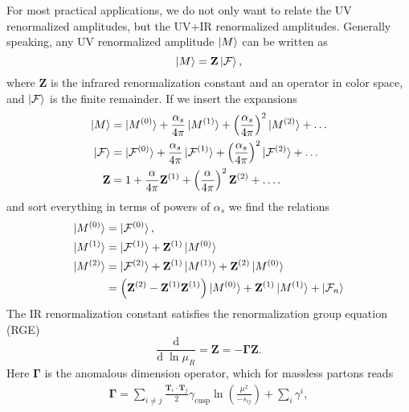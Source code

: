 \documentclass[a4paper,11pt]{article}
\begin{document}
For most practical applications, we do not only want to relate the UV renormalized amplitudes, but the UV+IR renormalized amplitudes. Generally speaking, any UV renormalized amplitude $\ket{M}$ can be written as
\begin{equation}
\ket{M} = \mathbf{Z} \ket{\mathcal{F}},
\end{equation}
where $\mathbf{Z}$ is the infrared renormalization constant and an operator in color space, and $\ket{\mathcal{F}}$ is the finite remainder. If we insert the expansions
\begin{equation}
\begin{split}
\ket{M} &= \ket{M^{(0)}} + \frac{\alpha_s}{4 \pi} \ket{M^{(1)}} + \left(\frac{\alpha_s}{4 \pi} \right)^2 \ket{M^{(2)}} + \ldots \\
\ket{\mathcal{F}} &= \ket{\mathcal{F}^{(0)}} + \frac{\alpha_s}{4 \pi} \ket{\mathcal{F}^{(1)}} + \left(\frac{\alpha_s}{4 \pi} \right)^2 \ket{\mathcal{F}^{(2)}} + \ldots \\
\mathbf{Z} &= 1 + \frac{\alpha}{4 \pi} \mathbf{Z}^{(1)} + \left(\frac{\alpha}{4 \pi} \right)^2 \mathbf{Z}^{(2)} + \ldots.
\end{split}
\end{equation}
and sort everything in terms of powers of $\alpha_s$ we find the relations
\begin{equation}
\begin{split}
\ket{M^{(0)}} &= \ket{\mathcal{F}^{(0)}}, \\
\ket{M^{(1)}} &= \ket{\mathcal{F}^{(1)}} + \mathbf{Z}^{(1)} \ket{M^{(0)}} \\
\ket{M^{(2)}} &= \ket{\mathcal{F}^{(2)}} + \mathbf{Z}^{(1)} \ket{M^{(1)}} + \mathbf{Z}^{(2)} \ket{M^{(0)}} \\
&= \left(\mathbf{Z}^{(2)} - \mathbf{Z}^{(1)} \mathbf{Z}^{(1)} \right) \ket{M^{(0)}} + \mathbf{Z}^{(1)} \ket{M^{(1)}} + \ket{\mathcal{F}_n}
\end{split}
\end{equation}
The IR renormalization constant satisfies the renormalization group equation (RGE)
\begin{equation}
\frac{\mathrm{d}}{\mathrm{d}\; \ln \mu_R} = \mathbf{Z} = - \mathbf{\Gamma} \mathbf{Z}.
\end{equation}
Here $\mathbf{\Gamma}$ is the anomalous dimension operator, which for massless partons reads
\begin{equation}
\begin{split}
\mathbf{\Gamma} = \sum_{i \neq j} \frac{\mathbf{T}_i \cdot \mathbf{T}_j}{2} \gamma_{\text{cusp}} \ln\!\left(\frac{\mu^2}{-s_{ij}} \right) + \sum_i \gamma^i,
\end{split}
\end{equation}
\end{document}
